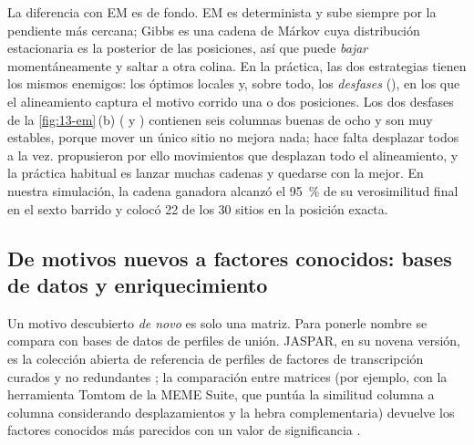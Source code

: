 \begin{simbolos}
\end{simbolos}

La diferencia con EM es de fondo. EM es determinista y sube siempre por la pendiente más cercana; Gibbs es una cadena de Márkov cuya distribución estacionaria es la posterior de las posiciones, así que puede \emph{bajar} momentáneamente y saltar a otra colina. En la práctica, las dos estrategias tienen los mismos enemigos: los óptimos locales y, sobre todo, los \emph{desfases} (), en los que el alineamiento captura el motivo corrido una o dos posiciones. Los dos desfases de la \cref{fig:13-em}\,(b) ( y ) contienen seis columnas buenas de ocho y son muy estables, porque mover un único sitio no mejora nada; hace falta desplazar todos a la vez. \textcite{c13-lawrence1993} propusieron por ello movimientos que desplazan todo el alineamiento, y la práctica habitual es lanzar muchas cadenas y quedarse con la mejor. En nuestra simulación, la cadena ganadora alcanzó el \SI{95}{\percent} de su verosimilitud final en el sexto barrido y colocó 22 de los 30 sitios en la posición exacta.


\subsection{De motivos nuevos a factores conocidos: bases de datos y enriquecimiento}

Un motivo descubierto \emph{de novo} es solo una matriz. Para ponerle nombre se compara con bases de datos de perfiles de unión. JASPAR, en su novena versión, es la colección abierta de referencia de perfiles de factores de transcripción curados y no redundantes \parencite{c13-castromondragon2022}; la comparación entre matrices (por ejemplo, con la herramienta Tomtom de la MEME Suite, que puntúa la similitud columna a columna considerando desplazamientos y la hebra complementaria) devuelve los factores conocidos más parecidos con un valor de significancia \parencite{c13-bailey2009}.

